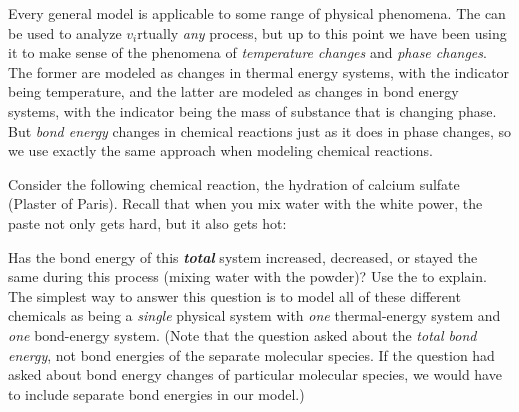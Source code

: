 \label{fnt1.1.4-1}

Every general model is applicable to some range of physical phenomena. The \EnergyInteractionModel{} can be used to analyze $v_i$rtually {\em any} process, but up to this point we have been using it to make sense of the phenomena of {\em temperature changes} and {\em phase changes}. The former are modeled as changes in thermal energy systems, with the indicator being temperature, and the latter are modeled as changes in bond energy systems, with the indicator being the mass of substance that is changing phase. But {\em bond energy} changes in chemical reactions just as it does in phase changes, so we use exactly the same approach when modeling chemical reactions.

Consider the following chemical reaction, the hydration of calcium sulfate (Plaster of Paris). Recall that when you mix water with the white power, the paste not only gets hard, but it also gets hot:
\begin{center}
\end{center}
Has the bond energy of this \textbf{\em total} system increased, decreased, or stayed the same during this process (mixing water with the powder)?  Use the \EnergyInteractionModel{} to explain. The simplest way to answer this question is to model all of these different chemicals as being a {\em single} physical system with {\em one} thermal-energy system and {\em one} bond-energy system. (Note that the question asked about the {\em total bond energy}, not bond energies of the separate molecular species. If the question had asked about bond energy changes of particular molecular species, we would have to include separate bond energies in our model.)


